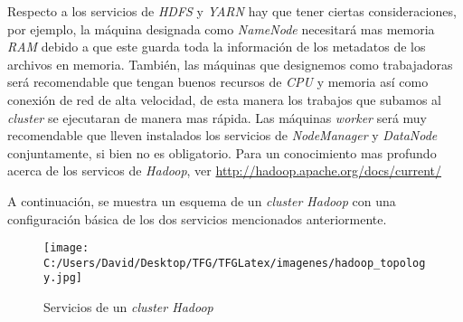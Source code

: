 Respecto a los servicios de \textit{HDFS} y \textit{YARN} hay que tener ciertas consideraciones,
por ejemplo, la máquina designada como \textit{NameNode} necesitará mas memoria \textit{RAM} 
debido a que este guarda toda la información de los metadatos de los archivos en memoria. 
También, las máquinas que designemos como trabajadoras será recomendable que tengan buenos recursos 
de \textit{CPU} y memoria así como conexión de red de alta velocidad, de esta manera los trabajos 
que subamos al \textit{cluster} se ejecutaran de manera mas rápida.
Las máquinas \textit{worker} será muy recomendable que lleven instalados los servicios de 
\textit{NodeManager} y \textit{DataNode} conjuntamente, si bien no es obligatorio.
Para un conocimiento mas profundo acerca de los servicos de \textit{Hadoop}, ver 
\url{http://hadoop.apache.org/docs/current/}
\newline

A continuación, se muestra un esquema de un \textit{cluster Hadoop} con una configuración básica de los dos 
servicios mencionados anteriormente.

\begin{figure}[h]
  \centering
  \texttt{[image: C:/Users/David/Desktop/TFG/TFGLatex/imagenes/hadoop\_topology.jpg]}
  \caption[Servicios de un \textit{cluster Hadoop}]{Servicios de un \textit{cluster Hadoop}}
  \label{hadoop_topology}
\end{figure}

\clearpage